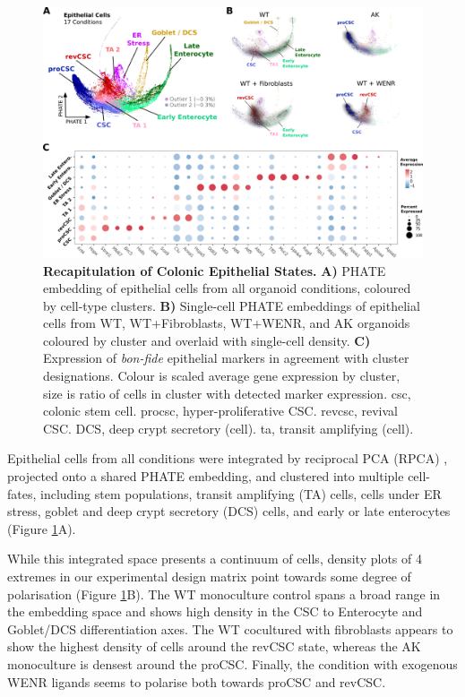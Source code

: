 \begin{figure}[H]
    \centering
    \includegraphics{04seq/figs/4SEQ_INTctrl.png}
    \caption{\textbf{Recapitulation of Colonic Epithelial States.} \textbf{A)} PHATE embedding of epithelial cells from all organoid conditions, coloured by cell-type clusters. \textbf{B)} Single-cell PHATE embeddings of epithelial cells from WT, WT+Fibroblasts, WT+WENR, and AK organoids coloured by cluster and overlaid with single-cell density. \textbf{C)} Expression of \emph{bon-fide} epithelial markers in agreement with cluster designations. Colour is scaled average gene expression by cluster, size is ratio of cells in cluster with detected marker expression. \acrshort{csc}, colonic stem cell. \acrshort{procsc}, hyper-proliferative CSC. \acrshort{revcsc}, revival CSC. DCS, deep crypt secretory (cell). \acrshort{ta}, transit amplifying (cell).}
    \label{fig:4intepi}
\end{figure}

Epithelial cells from all conditions were integrated by reciprocal PCA (RPCA) \cite{hao_integrated_2021}, projected onto a shared PHATE embedding, and clustered into multiple cell-fates, including stem populations, transit amplifying (TA) cells, cells under ER stress, goblet and deep crypt secretory (DCS) cells, and early or late enterocytes (Figure \ref{fig:4intepi}A). 

While this integrated space presents a continuum of cells, density plots of 4 extremes in our experimental design matrix point towards some degree of polarisation (Figure \ref{fig:4intepi}B). The WT monoculture control spans a broad range in the embedding space and shows high density in the CSC to Enterocyte and Goblet/DCS differentiation axes. The WT cocultured with fibroblasts appears to show the highest density of cells around the revCSC state, whereas the AK monoculture is densest around the proCSC. Finally, the condition with exogenous WENR ligands seems to polarise both towards proCSC and revCSC.

